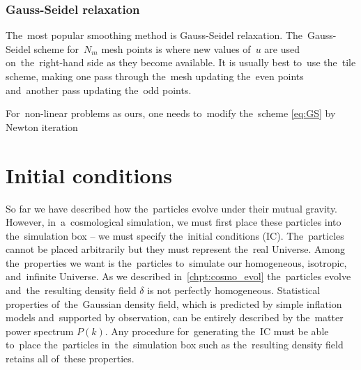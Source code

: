 \subsubsection{Gauss-Seidel relaxation}
The~most popular smoothing method is Gauss-Seidel relaxation. The~Gauss-Seidel scheme for~$N_m$ mesh points is
where new values of~$u$ are used on~the~right-hand side as they become available. It is usually best to~use the~tile scheme, making one pass through the~mesh updating the~even points and~another pass updating the~odd points.

For~non-linear problems as ours, one needs to~modify the~scheme \eqref{eq:GS} by Newton iteration
\section{Initial conditions}
So far we have described how the~particles evolve under their mutual gravity. However, in~a~cosmological simulation, we must first place these particles into the~simulation box -- we must specify the~initial conditions (IC). The~particles cannot be placed arbitrarily but they must represent the~real Universe. Among the~properties we want is the~particles to~simulate our homogeneous, isotropic, and~infinite Universe. As we described in~\autoref{chpt:cosmo_evol} the~particles evolve and~the~resulting density field $\delta$ is not perfectly homogeneous. Statistical properties of~the~Gaussian density field, which is predicted by simple inflation models and~supported by observation, can be entirely described by the~matter power spectrum $P(k)$. Any procedure for~generating the~IC must be able to~place the~particles in~the~simulation box such as the~resulting density field retains all of~these properties.

